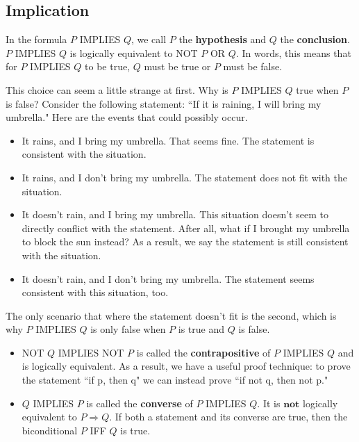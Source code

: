 \documentclass[12pt,letterpaper]{article}
\begin{document}


\subsection{Implication}

In the formula $P$ IMPLIES $Q$, we call $P$ the \textbf{hypothesis} and $Q$ the \textbf{conclusion}. $P$ IMPLIES $Q$ is logically equivalent to NOT $P$ OR $Q$. In words, this means that for $P$ IMPLIES $Q$ to be true, $Q$ must be true or $P$ must be false.

This choice can seem a little strange at first. Why is $P$ IMPLIES $Q$ true when $P$ is false? Consider the following statement: ``If it is raining, I will bring my umbrella." Here are the events that could possibly occur.

\begin{itemize}
    \item It rains, and I bring my umbrella. That seems fine. The statement is consistent with the situation.
    \item It rains, and I don't bring my umbrella. The statement does not fit with the situation.
    \item It doesn't rain, and I bring my umbrella. This situation doesn't seem to directly conflict with the statement. After all, what if I brought my umbrella to block the sun instead? As a result, we say the statement is still consistent with the situation.
    \item It doesn't rain, and I don't bring my umbrella. The statement seems consistent with this situation, too.
\end{itemize}

The only scenario that where the statement doesn't fit is the second, which is why $P$ IMPLIES $Q$ is only false when $P$ is true and $Q$ is false.

\begin{itemize}
    \item NOT $Q$ IMPLIES NOT $P$ is called the \textbf{contrapositive} of $P$ IMPLIES $Q$ and is logically equivalent. As a result, we have a useful proof technique: to prove the statement ``if p, then q" we can instead prove ``if not q, then not p."
    \item $Q$ IMPLIES $P$ is called the \textbf{converse} of $P$ IMPLIES $Q$. It is $\textbf{not}$ logically equivalent to $P \Rightarrow Q$. If both a statement and its converse are true, then the biconditional $P$ IFF $Q$ is true.
\end{itemize}
\end{document}
